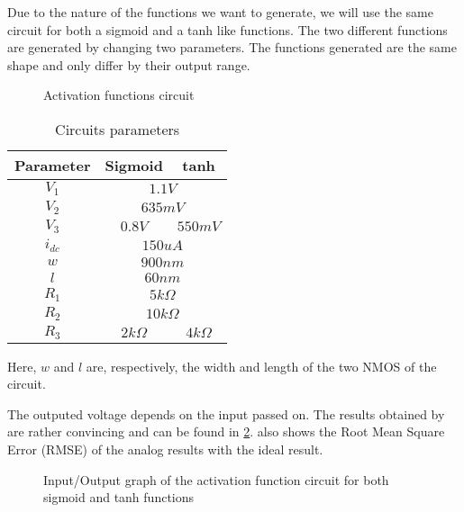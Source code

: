 Due to the nature of the functions we want to generate, we will use the same circuit for both a sigmoid and a \ac{tanh} like functions. The two different functions are generated by changing two parameters. The functions generated are the same shape and only differ by their output range.

\begin{figure}[t]
  \centering
  
  \caption{Activation functions circuit}
  \label{circt:af}
\end{figure}

\begin{table}[b]
  \caption{Circuits parameters}
  \label{tab:afPar}
  \centering
  \begin{tabular}{|c|c|c|}
    \hline
    \textbf{Parameter} & \textbf{Sigmoid} & \textbf{\ac{tanh}} \\
    \hline
    $V_1$ & \multicolumn{2}{c|}{$1.1V$}\\
    \hline
    $V_2$ & \multicolumn{2}{c|}{$635mV$}\\
    \hline
    $V_3$ & $0.8V$ & $550mV$\\
    \hline
    $i_{dc}$ & \multicolumn{2}{c|}{$150uA$}\\
    \hline
    $w$ & \multicolumn{2}{c|}{$900nm$}\\
    \hline
    $l$ & \multicolumn{2}{c|}{$60nm$}\\
    \hline
    $R_1$ & \multicolumn{2}{c|}{$5k\Omega$}\\
    \hline
    $R_2$ & \multicolumn{2}{c|}{$10k\Omega$}\\
    \hline
    $R_3$ & $2k\Omega$ & $4k\Omega$\\
    \hline
  \end{tabular}
\end{table}

Here, $w$ and $l$ are, respectively, the width and length of the two NMOS of the circuit.

The outputed voltage depends on the input passed on. The results obtained by are rather convincing and can be found in \cref{graph:af}.  also shows the Root Mean Square Error (RMSE) of the analog results with the ideal result.

\begin{figure}[t]
  \centering
  
  \caption{Input/Output graph of the activation function circuit for both sigmoid and \acs{tanh} functions}
  \label{graph:af}
\end{figure}

